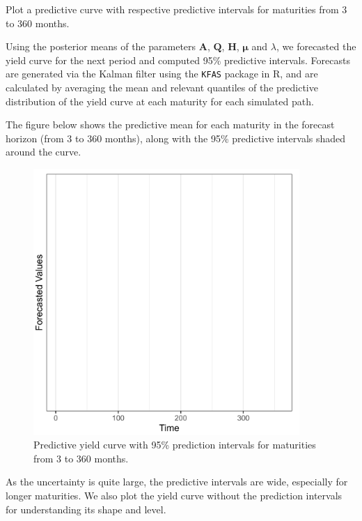 Plot a predictive curve with respective predictive intervals for maturities from 3 to 360 months.

Using the posterior means of the parameters $\mathbf{A}$, $\mathbf{Q}$, $\mathbf{H}$, $\mathbf{\mu}$ and $\lambda$, we forecasted the yield curve for the next period and computed 95\% predictive intervals. Forecasts are generated via the Kalman filter using the \texttt{KFAS} package in R, and are calculated by averaging the mean and relevant quantiles of the predictive distribution of the yield curve at each maturity for each simulated path. 

The figure below shows the predictive mean for each maturity in the forecast horizon (from 3 to 360 months), along with the 95\% predictive intervals shaded around the curve.

\begin{figure}[H]
    \centering
    \includegraphics[width=0.9\textwidth]{../figures/forecast.png}
    \caption{Predictive yield curve with 95\% prediction intervals for maturities from 3 to 360 months.}
\end{figure}

As the uncertainty is quite large, the predictive intervals are wide, especially for longer maturities. We also plot the yield curve without the prediction intervals for understanding its shape and level.


